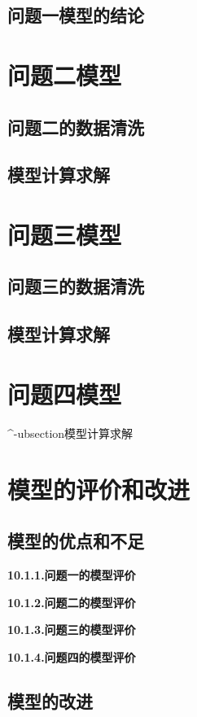 \documentclass{cumcmthesis}
\begin{document}
	\subsection{问题一模型的结论}
	\section{问题二模型}
		\subsection{问题二的数据清洗}
	\subsection{模型计算求解}	
	\section{问题三模型}
		\subsection{问题三的数据清洗}
	\subsection{模型计算求解}
	\section{问题四模型}
	
	\s\ar[ul]^-{u}bsection{模型计算求解}
	
	\section{模型的评价和改进}
	
	\subsection{模型的优点和不足}	
	
	\noindent\textbf{10.1.1.问题一的模型评价}
	
	\noindent\textbf{10.1.2.问题二的模型评价}
	
	\noindent\textbf{10.1.3.问题三的模型评价}
	
	\noindent\textbf{10.1.4.问题四的模型评价}
	
	\subsection{模型的改进}	
	
\end{document}
